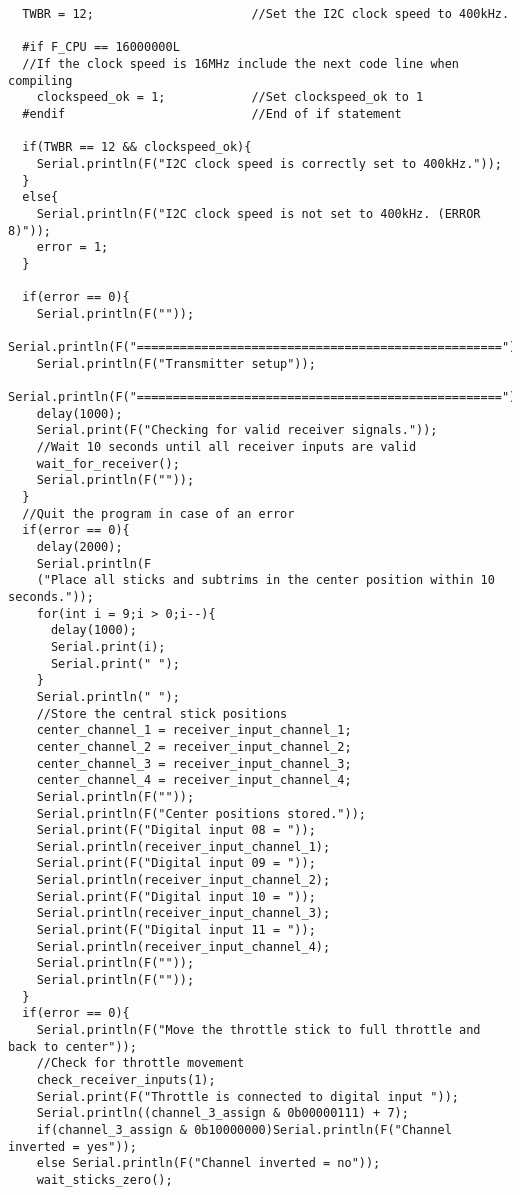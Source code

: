 \begin{lstlisting}
  TWBR = 12;                      //Set the I2C clock speed to 400kHz.
  
  #if F_CPU == 16000000L          
  //If the clock speed is 16MHz include the next code line when compiling
    clockspeed_ok = 1;            //Set clockspeed_ok to 1
  #endif                          //End of if statement

  if(TWBR == 12 && clockspeed_ok){
    Serial.println(F("I2C clock speed is correctly set to 400kHz."));
  }
  else{
    Serial.println(F("I2C clock speed is not set to 400kHz. (ERROR 8)"));
    error = 1;
  }
  
  if(error == 0){
    Serial.println(F(""));
    Serial.println(F("==================================================="));
    Serial.println(F("Transmitter setup"));
    Serial.println(F("==================================================="));
    delay(1000);
    Serial.print(F("Checking for valid receiver signals."));
    //Wait 10 seconds until all receiver inputs are valid
    wait_for_receiver();
    Serial.println(F(""));
  }
  //Quit the program in case of an error
  if(error == 0){
    delay(2000);
    Serial.println(F
    ("Place all sticks and subtrims in the center position within 10 seconds."));
    for(int i = 9;i > 0;i--){
      delay(1000);
      Serial.print(i);
      Serial.print(" ");
    }
    Serial.println(" ");
    //Store the central stick positions
    center_channel_1 = receiver_input_channel_1;
    center_channel_2 = receiver_input_channel_2;
    center_channel_3 = receiver_input_channel_3;
    center_channel_4 = receiver_input_channel_4;
    Serial.println(F(""));
    Serial.println(F("Center positions stored."));
    Serial.print(F("Digital input 08 = "));
    Serial.println(receiver_input_channel_1);
    Serial.print(F("Digital input 09 = "));
    Serial.println(receiver_input_channel_2);
    Serial.print(F("Digital input 10 = "));
    Serial.println(receiver_input_channel_3);
    Serial.print(F("Digital input 11 = "));
    Serial.println(receiver_input_channel_4);
    Serial.println(F(""));
    Serial.println(F(""));
  }
  if(error == 0){  
    Serial.println(F("Move the throttle stick to full throttle and back to center"));
    //Check for throttle movement
    check_receiver_inputs(1);
    Serial.print(F("Throttle is connected to digital input "));
    Serial.println((channel_3_assign & 0b00000111) + 7);
    if(channel_3_assign & 0b10000000)Serial.println(F("Channel inverted = yes"));
    else Serial.println(F("Channel inverted = no"));
    wait_sticks_zero();
    

\end{lstlisting}
